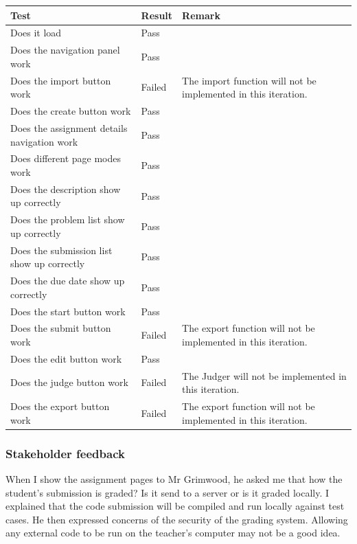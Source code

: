 \documentclass[a4paper]{report}
\begin{document}
\begin{tabulary}{\linewidth}{|L|l|L|}
    \hline
    Test & Result & Remark \\
    \hline
    Does it load & Pass & \\
    \hline
    Does the navigation panel work & Pass &  \\
    \hline
    Does the import button work & Failed & The import function will not be implemented in this iteration.  \\
    \hline
    Does the create button work & Pass & \\
    \hline
    Does the assignment details navigation work & Pass & \\
    \hline
    Does different page modes work & Pass & \\
    \hline
    Does the description show up correctly & Pass & \\
    \hline
    Does the problem list show up correctly & Pass & \\
    \hline
    Does the submission list show up correctly & Pass & \\
    \hline
    Does the due date show up correctly & Pass & \\
    \hline
    Does the start button work & Pass & \\
    \hline
    Does the submit button work & Failed & The export function will not be implemented in this iteration. \\
    \hline
    Does the edit button work & Pass & \\
    \hline
    Does the judge button work & Failed & The Judger will not be implemented in this iteration. \\
    \hline
    Does the export button work & Failed & The export function will not be implemented in this iteration. \\
    \hline
\end{tabulary}

\subsubsection{Stakeholder feedback}

When I show the assignment pages to Mr Grimwood, he asked me that how the student's submission is graded? Is it send to a server or is it graded locally. I explained that the code submission will be compiled and run locally against test cases. He then expressed concerns of the security of the grading system. Allowing any external code to be run on the teacher's computer may not be a good idea.
\end{document}
